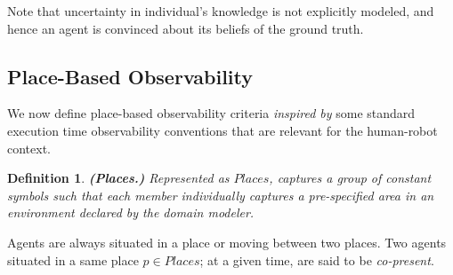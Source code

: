 \documentclass[letterpaper]{article} %
\newtheorem{definition}{Definition}
\begin{document}
Note that uncertainty in individual's knowledge is not explicitly modeled, and hence an agent is convinced about its beliefs of the ground truth.

\subsection{Place-Based Observability}
We now define place-based observability criteria \textit{inspired by} some standard execution time observability conventions that are relevant for the human-robot context. 

\begin{definition}
\textbf{(Places.)} Represented as $\mathit{Places}$, captures a group of constant symbols such that each member individually captures a pre-specified area in an environment declared by the domain modeler.  
\end{definition}
Agents are always situated in a place or moving between two places. Two agents situated in a same place $p \in \mathit{Places}$; at a given time, are said to be \textit{co-present}.


\end{document}
